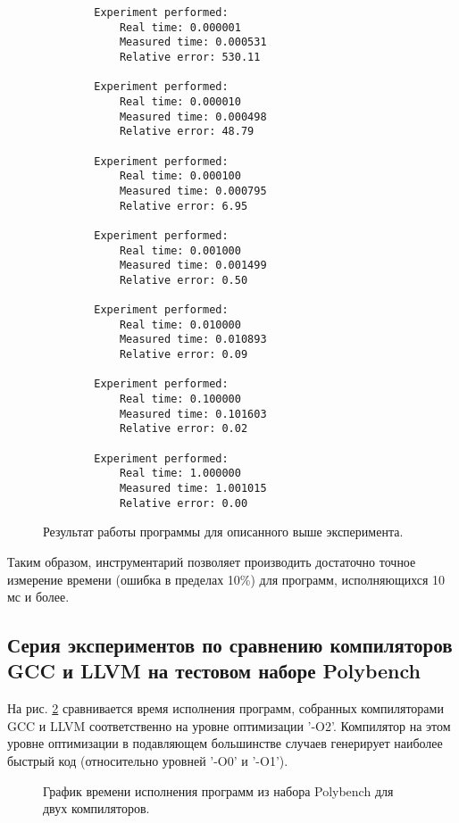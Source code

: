 \begin{figure}[H]
    \fontsize{10}{12}
    \begin{verbatim}
        Experiment performed:
            Real time: 0.000001
            Measured time: 0.000531
            Relative error: 530.11
        
        Experiment performed:
            Real time: 0.000010
            Measured time: 0.000498
            Relative error: 48.79
        
        Experiment performed:
            Real time: 0.000100
            Measured time: 0.000795
            Relative error: 6.95
        
        Experiment performed:
            Real time: 0.001000
            Measured time: 0.001499
            Relative error: 0.50
        
        Experiment performed:
            Real time: 0.010000
            Measured time: 0.010893
            Relative error: 0.09
        
        Experiment performed:
            Real time: 0.100000
            Measured time: 0.101603
            Relative error: 0.02
        
        Experiment performed:
            Real time: 1.000000
            Measured time: 1.001015
            Relative error: 0.00
    \end{verbatim}
    \caption{Результат работы программы для описанного выше эксперимента.}
    \label{img:default_calibration}
\end{figure}

Таким образом, инструментарий позволяет производить достаточно точное измерение времени (ошибка в пределах 10\%) для программ, исполняющихся 10 мс и более.


\subsection{Серия экспериментов по сравнению компиляторов GCC и LLVM на тестовом наборе Polybench}
\label{series-llvm-vs-gcc}
На рис. \ref{img:gcc-vs-clang} сравнивается время исполнения программ, собранных компиляторами GCC и LLVM соответственно на уровне оптимизации '-O2'. Компилятор на этом уровне оптимизации в подавляющем большинстве случаев генерирует наиболее быстрый код (относительно уровней '-O0' и '-O1').

\begin{figure}[!bH]
    \caption{График времени исполнения программ из набора Polybench для двух компиляторов.}
    \label{img:gcc-vs-clang}
\end{figure}

